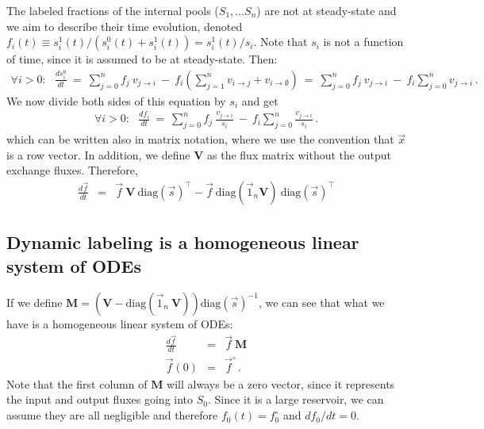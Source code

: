 \documentclass{article}
\newcommand{\finit}{\ensuremath{\vec{f}^\circ}}
\newcommand{\flux}[2]{\ensuremath{v_{{#1} \rightarrow {#2}}}}
\begin{document}
The labeled fractions of the internal pools ($S_1, \ldots S_n$) are not at steady-state and we aim to describe their time evolution, denoted $f_i(t) \equiv s_i^1(t) / (s_i^0(t) + s_i^1(t)) = s_i^1(t) / s_i$. Note that $s_i$ is not a function of time, since it is assumed to be at steady-state. Then:
\begin{eqnarray}
    \forall i > 0: ~~~ \frac{d s_i^0}{dt}
    ~=~
    \sum_{j=0}^{n} f_j~\flux{j}{i} ~-~ f_i \left( \sum_{j=1}^n \flux{i}{j} + \flux{i}{\emptyset} \right)
    ~=~
    \sum_{j=0}^{n} f_j~\flux{j}{i} ~-~ f_i \sum_{j=0}^{n} \flux{j}{i}\,.
\end{eqnarray}
We now divide both sides of this equation by $s_i$ and get
\begin{eqnarray}
\forall i > 0: ~~~ \frac{d f_i}{dt}
~=~
\sum_{j=0}^{n} f_j~\frac{\flux{j}{i}}{s_i} ~-~ f_i \sum_{j=0}^{n} \frac{\flux{j}{i}}{s_i} 
\,.\label{eq:steady_state}
\end{eqnarray}
which can be written also in matrix notation, where we use the convention that $\vec{x}$ is a row vector. In addition, we define $\mathbf{V}$ as the flux matrix without the output exchange fluxes. Therefore,
\begin{eqnarray}
	\frac{d\vec{f}}{dt} 
	&=& \vec{f}~\mathbf{V}~\text{diag}(\vec{s})^\top - \vec{f}~\text{diag}(\vec{1}_n \mathbf{V})~\text{diag}(\vec{s})^\top
\end{eqnarray}

\subsection{Dynamic labeling is a homogeneous linear system of ODEs}
If we define $\mathbf{M} = \left(\mathbf{V} - \text{diag}(\vec{1}_n~\mathbf{V})\right) \text{diag}(\vec{s})^{-1}$, we can see that what we have is a homogeneous linear system of ODEs:
\begin{eqnarray}\label{eq:homogenous}
    \frac{d\vec{f}}{d t} &=& \vec{f}~\mathbf{M} \\
    \vec{f}(0) &=& \finit\,.
\end{eqnarray}
Note that the first column of $\mathbf{M}$ will always be a zero vector, since it represents the input and output fluxes going into $S_0$. Since it is a large reservoir, we can assume they are all negligible and therefore $f_0(t) = f^\circ_0$ and $df_0 / dt = 0$.
\end{document}
